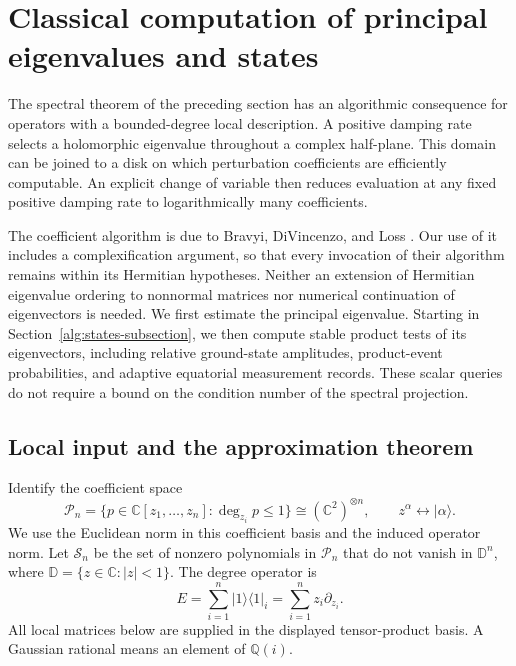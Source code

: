 \documentclass[reqno]{amsart}
\theoremstyle{definition}
\theoremstyle{remark}
\newcommand{\C}{\mathbb C}
\newcommand{\D}{\mathbb D}
\begin{document}

\section{Classical computation of principal eigenvalues and states}
\label{alg:section}

The spectral theorem of the preceding section has an algorithmic consequence
for operators with a bounded-degree local description.  A positive damping
rate selects a holomorphic eigenvalue throughout a complex half-plane.
This domain can be joined to a disk on which perturbation coefficients are
efficiently computable.  An explicit change of variable then reduces
evaluation at any fixed positive damping rate to logarithmically many
coefficients.

The coefficient algorithm is due to Bravyi, DiVincenzo, and Loss
\cite{BDL08}.  Our use of it includes a complexification argument, so that
every invocation of their algorithm remains within its Hermitian
hypotheses.  Neither an extension of Hermitian eigenvalue ordering to
nonnormal matrices nor numerical continuation of eigenvectors is needed.
We first estimate the principal eigenvalue.  Starting in
Section~\ref{alg:states-subsection}, we then compute stable product
tests of its eigenvectors, including relative ground-state amplitudes,
product-event probabilities, and adaptive equatorial measurement
records.  These scalar queries do not require a bound on the condition
number of the spectral projection.

\subsection{Local input and the approximation theorem}
\label{alg:input-subsection}

Identify the coefficient space
\[
 \mathcal P_n
 =\{p\in\C[z_1,\ldots,z_n]:\deg_{z_i}p\le1\}
 \cong(\C^2)^{\otimes n},
 \qquad z^\alpha\longleftrightarrow|\alpha\rangle.
\]
We use the Euclidean norm in this coefficient basis and the induced
operator norm.  Let \(\mathcal S_n\) be the set of nonzero polynomials in
\(\mathcal P_n\) that do not vanish in \(\D^n\), where
\(\D=\{z\in\C:|z|<1\}\).  The degree operator is
\begin{equation}
 E=\sum_{i=1}^n |1\rangle\langle1|_i
   =\sum_{i=1}^n z_i\partial_{z_i}.
 \label{alg:degree}
\end{equation}
All local matrices below are supplied in the displayed tensor-product
basis.  A Gaussian rational means an element of \(\mathbb Q(i)\).
\end{document}
